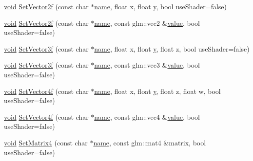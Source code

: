 \begin{DoxyCompactItemize}
\item 
\hyperlink{imgui__impl__opengl3__loader_8h_ac668e7cffd9e2e9cfee428b9b2f34fa7}{void} \hyperlink{classShaderComponent_a3d1a69de59f69c7b319f08639764a716}{Set\+Vector2f} (const char $\ast$\hyperlink{imgui__impl__opengl3__loader_8h_a5c4947d4516dd7cfa3505ce3a648a4ef}{name}, float x, float \hyperlink{imgui__impl__opengl3__loader_8h_a5e247fc24ceb70d83f6ad59149b8910a}{y}, bool use\+Shader=false)
\item 
\hyperlink{imgui__impl__opengl3__loader_8h_ac668e7cffd9e2e9cfee428b9b2f34fa7}{void} \hyperlink{classShaderComponent_af5e317ce56405fadb5c62d178c3f2420}{Set\+Vector2f} (const char $\ast$\hyperlink{imgui__impl__opengl3__loader_8h_a5c4947d4516dd7cfa3505ce3a648a4ef}{name}, const glm\+::vec2 \&\hyperlink{imgui__impl__opengl3__loader_8h_a32aff7c6c4cd253fdf6563677afab5ce}{value}, bool use\+Shader=false)
\item 
\hyperlink{imgui__impl__opengl3__loader_8h_ac668e7cffd9e2e9cfee428b9b2f34fa7}{void} \hyperlink{classShaderComponent_ad3a7bcb131f85976bda6eecc830dc41b}{Set\+Vector3f} (const char $\ast$\hyperlink{imgui__impl__opengl3__loader_8h_a5c4947d4516dd7cfa3505ce3a648a4ef}{name}, float x, float \hyperlink{imgui__impl__opengl3__loader_8h_a5e247fc24ceb70d83f6ad59149b8910a}{y}, float z, bool use\+Shader=false)
\item 
\hyperlink{imgui__impl__opengl3__loader_8h_ac668e7cffd9e2e9cfee428b9b2f34fa7}{void} \hyperlink{classShaderComponent_adc91769da0d93e210a8f743f898f1e06}{Set\+Vector3f} (const char $\ast$\hyperlink{imgui__impl__opengl3__loader_8h_a5c4947d4516dd7cfa3505ce3a648a4ef}{name}, const glm\+::vec3 \&\hyperlink{imgui__impl__opengl3__loader_8h_a32aff7c6c4cd253fdf6563677afab5ce}{value}, bool use\+Shader=false)
\item 
\hyperlink{imgui__impl__opengl3__loader_8h_ac668e7cffd9e2e9cfee428b9b2f34fa7}{void} \hyperlink{classShaderComponent_a2d7b6091a6b20cbb7ed5a219504d5f8e}{Set\+Vector4f} (const char $\ast$\hyperlink{imgui__impl__opengl3__loader_8h_a5c4947d4516dd7cfa3505ce3a648a4ef}{name}, float x, float \hyperlink{imgui__impl__opengl3__loader_8h_a5e247fc24ceb70d83f6ad59149b8910a}{y}, float z, float w, bool use\+Shader=false)
\item 
\hyperlink{imgui__impl__opengl3__loader_8h_ac668e7cffd9e2e9cfee428b9b2f34fa7}{void} \hyperlink{classShaderComponent_a241661f9491daf849d6b9a6d4ba497ff}{Set\+Vector4f} (const char $\ast$\hyperlink{imgui__impl__opengl3__loader_8h_a5c4947d4516dd7cfa3505ce3a648a4ef}{name}, const glm\+::vec4 \&\hyperlink{imgui__impl__opengl3__loader_8h_a32aff7c6c4cd253fdf6563677afab5ce}{value}, bool use\+Shader=false)
\item 
\hyperlink{imgui__impl__opengl3__loader_8h_ac668e7cffd9e2e9cfee428b9b2f34fa7}{void} \hyperlink{classShaderComponent_ae8dcaeeff884867548d48327dbd21f13}{Set\+Matrix4} (const char $\ast$\hyperlink{imgui__impl__opengl3__loader_8h_a5c4947d4516dd7cfa3505ce3a648a4ef}{name}, const glm\+::mat4 \&matrix, bool use\+Shader=false)
\end{DoxyCompactItemize}
